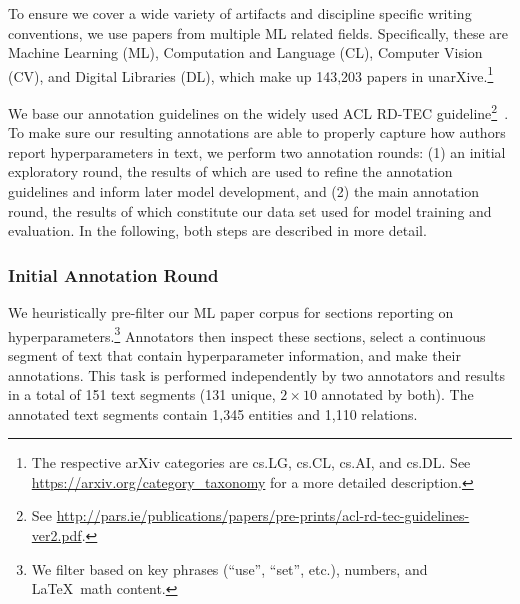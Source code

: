 To ensure we cover a wide variety of artifacts and discipline specific writing conventions, we use papers from multiple ML related fields. Specifically, these are Machine Learning (ML), Computation and Language (CL), Computer Vision (CV), and Digital Libraries (DL), which make up 143,203 papers in unarXive.\footnote{The respective arXiv categories are cs.LG, cs.CL, cs.AI, and cs.DL. See \url{https://arxiv.org/category_taxonomy} for a more detailed description.}

We base our annotation guidelines on the widely used ACL RD-TEC guideline\footnote{See \url{http://pars.ie/publications/papers/pre-prints/acl-rd-tec-guidelines-ver2.pdf}.}~\cite{Qasemizadeh2016}. To make sure our resulting annotations are able to properly capture how authors report hyperparameters in text, we perform two annotation rounds: (1) an initial exploratory round, the results of which are used to refine the annotation guidelines and inform later model development, and (2) the main annotation round, the results of which constitute our data set used for model training and evaluation. In the following, both steps are described in more detail.

\subsubsection{Initial Annotation Round}\label{sec:exploreannot}


We heuristically pre-filter our ML paper corpus for sections reporting on hyperparameters.\footnote{We filter based on key phrases (``use'', ``set'', etc.), numbers, and \LaTeX\ math content.} Annotators then inspect these sections, select a continuous segment of text that contain hyperparameter information, and make their annotations. This task is performed independently by two annotators and results in a total of 151 text segments (131 unique, $2\times10$ annotated by both). The annotated text segments contain 1,345 entities and 1,110 relations.

